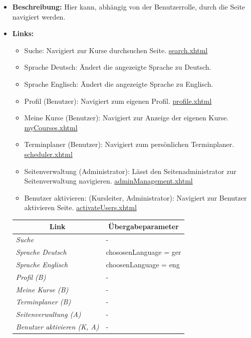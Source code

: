 		\begin{itemize}
			\item \textbf{Beschreibung:} Hier kann, abhängig von der Benutzerrolle, durch die Seite navigiert werden.
			\item \textbf{Links:}
			\begin{itemize}
				\item Suche: Navigiert zur Kurse durchsuchen Seite. \hyperlink{search}{search.xhtml}
				\item Sprache Deutsch: Ändert die angezeigte Sprache zu Deutsch.
				\item Sprache Englisch: Ändert die angezeigte Sprache zu Englisch.
				\item Profil (Benutzer): Navigiert zum eigenen Profil. \hyperlink{profile}{profile.xhtml}
				\item Meine Kurse (Benutzer): Navigiert zur Anzeige der eigenen Kurse. \hyperlink{myCourses}{myCourses.xhtml}
				\item Terminplaner (Benutzer): Navigiert zum persönlichen Terminplaner. \hyperlink{scheduler}{scheduler.xhtml}
				\item Seitenverwaltung (Administrator): Lässt den Seitenadministrator zur Seitenverwaltung navigieren. \hyperlink{adminManagement}{adminManagement.xhtml}
				\item Benutzer aktivieren: (Kursleiter, Administrator): Navigiert zur Benutzer aktivieren Seite. \hyperlink{activateUsers}{activateUsers.xhtml}
			\end{itemize}
			\begin{center}
				\begin{longtable}{|p{4cm} |p{6cm} |}

					\hline \multicolumn{1}{|c|}{\textbf{Link}} & \multicolumn{1}{|c|}{\textbf{\"{U}bergabeparameter}} \\ \hline
					\endfirsthead
					\hline
					\endlastfoot

					\textit{Suche} & -\\ \hline
					\textit{Sprache Deutsch} & chososenLanguage = ger\\ \hline
					\textit{Sprache Englisch} & choosenLanguage = eng\\ \hline
					\textit{Profil (B)} & -\\ \hline
					\textit{Meine Kurse (B)} & -\\ \hline
					\textit{Terminplaner (B)} & -\\ \hline
					\textit{Seitenverwaltung (A)} & -\\ \hline
					\textit{Benutzer aktivieren (K, A)} & -\\ \hline
				\end{longtable}
			\end{center}


\end{itemize}
